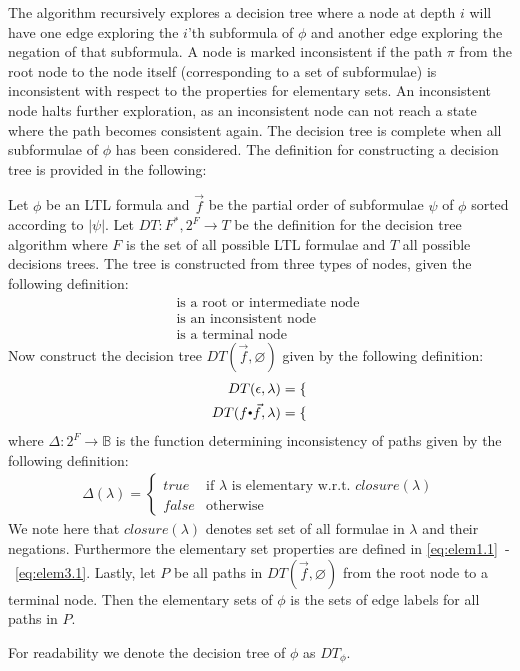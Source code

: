 The algorithm recursively explores a decision tree where a node at depth $i$ will have one edge exploring the $i$'th subformula of $\phi$ and another edge exploring the negation of that subformula. A node is marked inconsistent if the path $\pi$ from the root node to the node itself (corresponding to a set of subformulae) is inconsistent with respect to the properties for elementary sets. An inconsistent node halts further exploration, as an inconsistent node can not reach a state where the path becomes consistent again. The decision tree is complete when all subformulae of $\phi$ has been considered. The definition for constructing a decision tree is provided in the following:
\begin{definition}
Let $\phi$ be an LTL formula and $\vec{f}$ be the partial order of subformulae $\psi$ of $\phi$ sorted according to $|\psi|$. Let $DT: F^\ast, 2^F \rightarrow T$ be the definition for the decision tree algorithm where $F$ is the set of all possible LTL formulae and $T$ all possible decisions trees. The tree is constructed from three types of nodes, given the following definition:
\begin{align*}
     &\text{ is a root or intermediate node} \\
      &\text{ is an inconsistent node} \\
     &\text{ is a terminal node}
\end{align*}
Now construct the decision tree $DT(\vec{f}, \varnothing)$ given by the following definition:
\begin{align*}
    DT(\epsilon, \lambda) &= 
        \begin{cases}
            
        \end{cases}
    \\
    DT(f \tcdot \vec{f}, \lambda) &= 
        \begin{cases}
        
        \end{cases}
\end{align*}
where $\Delta: 2^F \rightarrow \mathbb{B}$ is the function determining inconsistency of paths given by the following definition:
\begin{align*}
    \Delta(\lambda) =
    \begin{cases}
        true & \text{if $\lambda$ is elementary w.r.t. $closure(\lambda)$} \\
        false & \text{otherwise}
    \end{cases}
\end{align*}
We note here that $closure(\lambda)$ denotes set set of all formulae in $\lambda$ and their negations. Furthermore the elementary set properties are defined in \autoref{eq:elem1.1}~-~\autoref{eq:elem3.1}. Lastly, let $P$ be all paths in $DT(\vec{f}, \varnothing)$ from the root node to a terminal node. Then the elementary sets of $\phi$ is the sets of edge labels for all paths in $P$.

For readability we denote the decision tree of $\phi$ as $DT_\phi$.
\end{definition}

